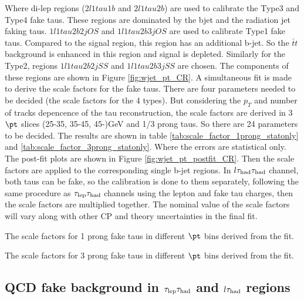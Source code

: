 Where di-lep regions ($2l1tau1b$ and $2l1tau2b$) are used to calibrate the Type3 and Type4 fake taus. These regions are dominated by the bjet and the radiation jet faking taus. $1l1tau2b2j OS$ and $1l1tau2b3j OS$ are used to calibrate Type1 fake taus. Compared to the signal region, this region has an additional b-jet. So the $\bar{t}t$ background is enhanced in this region and signal is depleted. Similarly for the Type2, regions $1l1tau2b2j SS$ and $1l1tau2b3j SS$ are chosen. The components of these regions are shown in Figure \ref{fig:wjet_pt_CR}. A simultaneous fit is made to derive the scale factors for the fake taus. There are four parameters needed to be decided (the scale factors for the 4 types). But considering the $p_{T}$ and number of tracks depencence of the tau reconstruction, the scale factors are derived in 3 $\pt$ slices (25-35, 35-45, 45-)GeV and 1/3 prong taus. So there are 24 parameters to be decided. The results are shown in table \ref{tab:scale_factor_1prong_statonly} and \ref{tab:scale_factor_3prong_statonly}. Where the errors are statistical only. The post-fit plots are shown in Figure \ref{fig:wjet_pt_postfit_CR}. Then the scale factors are applied to the corresponding single b-jet regions. In $l\tau_\text{had}{}\tau_\text{had}$ channel, both taus can be fake, so the calibration is done to them separately, following the same procedure as $\tau_\text{lep}{}\tau_\text{had}$ channels using the lepton and fake tau charges, then the scale factors are multiplied together. The nominal value of the scale factors will vary along with other CP and theory uncertainties in the final fit.

\begin{table}
\caption{The scale factors for 1 prong fake taus in different $\pt$ bins derived from the fit.}
\label{tab:scale_factor_1prong_statonly}

\end{table}
\begin{table}
\caption{The scale factors for 3 prong fake taus in different $\pt$ bins derived from the fit.}
\label{tab:scale_factor_3prong_statonly}

\end{table}





\subsection{QCD fake background in $\tau_\text{lep}{}\tau_\text{had}$ and $l\tau_\text{had}$ regions}

